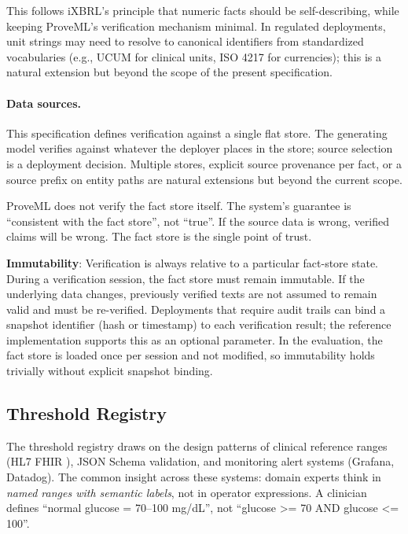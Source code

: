 \documentclass[11pt,a4paper]{article}
\begin{document}
This follows iXBRL's principle that numeric facts should be self-describing, while keeping ProveML's verification mechanism minimal. In regulated deployments, unit strings may need to resolve to canonical identifiers from standardized vocabularies (e.g., UCUM for clinical units, ISO 4217 for currencies); this is a natural extension but beyond the scope of the present specification.

\paragraph{Data sources.} This specification defines verification against a single flat store. The generating model verifies against whatever the deployer places in the store; source selection is a deployment decision. Multiple stores, explicit source provenance per fact, or a source prefix on entity paths are natural extensions but beyond the current scope.

\noindent ProveML does not verify the fact store itself. The system's guarantee is ``consistent with the fact store'', not ``true''. If the source data is wrong, verified claims will be wrong. The fact store is the single point of trust.

\textbf{Immutability}: Verification is always relative to a particular fact-store state. During a verification session, the fact store must remain immutable. If the underlying data changes, previously verified texts are not assumed to remain valid and must be re-verified. Deployments that require audit trails can bind a snapshot identifier (hash or timestamp) to each verification result; the reference implementation supports this as an optional parameter. In the evaluation, the fact store is loaded once per session and not modified, so immutability holds trivially without explicit snapshot binding.

\subsection{Threshold Registry}

The threshold registry draws on the design patterns of clinical reference ranges (HL7 FHIR \citep{fhir}), JSON Schema validation, and monitoring alert systems (Grafana, Datadog). The common insight across these systems: domain experts think in \textit{named ranges with semantic labels}, not in operator expressions. A clinician defines ``normal glucose = 70--100 mg/dL'', not ``glucose >= 70 AND glucose <= 100''.
\end{document}

